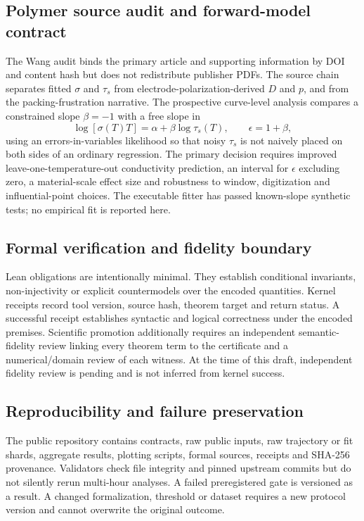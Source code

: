 \documentclass[pdflatex,sn-nature]{sn-jnl}
\begin{document}
\subsection{Polymer source audit and forward-model contract}

The Wang audit binds the primary article and supporting information by DOI and content hash but does not redistribute publisher PDFs. The source chain separates fitted $\sigma$ and $\tau_s$ from electrode-polarization-derived $D$ and $p$, and from the packing-frustration narrative. The prospective curve-level analysis compares a constrained slope $\beta=-1$ with a free slope in
\begin{equation}
 \log[\sigma(T)T]=\alpha+\beta\log\tau_s(T),\qquad \epsilon=1+\beta,
\end{equation}
using an errors-in-variables likelihood so that noisy $\tau_s$ is not naively placed on both sides of an ordinary regression. The primary decision requires improved leave-one-temperature-out conductivity prediction, an interval for $\epsilon$ excluding zero, a material-scale effect size and robustness to window, digitization and influential-point choices. The executable fitter has passed known-slope synthetic tests; no empirical fit is reported here.

\subsection{Formal verification and fidelity boundary}

Lean obligations are intentionally minimal. They establish conditional invariants, non-injectivity or explicit countermodels over the encoded quantities. Kernel receipts record tool version, source hash, theorem target and return status. A successful receipt establishes syntactic and logical correctness under the encoded premises. Scientific promotion additionally requires an independent semantic-fidelity review linking every theorem term to the certificate and a numerical/domain review of each witness. At the time of this draft, independent fidelity review is pending and is not inferred from kernel success.

\subsection{Reproducibility and failure preservation}

The public repository contains contracts, raw public inputs, raw trajectory or fit shards, aggregate results, plotting scripts, formal sources, receipts and SHA-256 provenance. Validators check file integrity and pinned upstream commits but do not silently rerun multi-hour analyses. A failed preregistered gate is versioned as a result. A changed formalization, threshold or dataset requires a new protocol version and cannot overwrite the original outcome.
\end{document}

